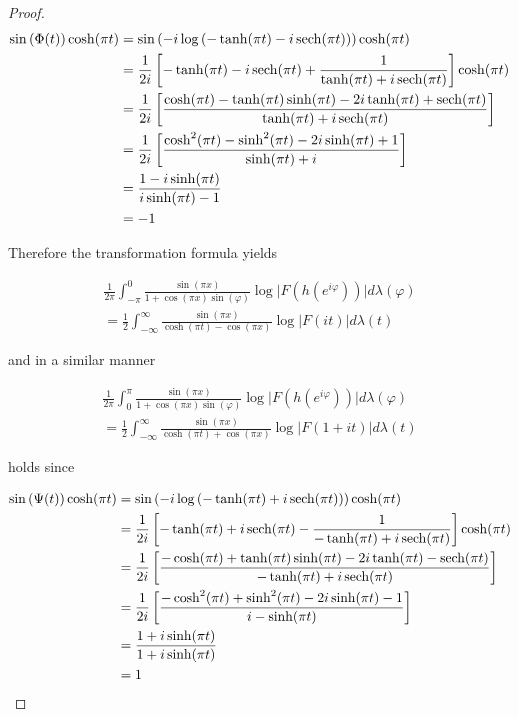 \begin{proof}
\begin{gather*}
	\begin{aligned}
		\sin\left( \Phi(t) \right)\cosh(\pi t) &= \sin\left( -i\log\left( -\tanh (\pi t) - i \operatorname{sech}(\pi t) \right)\right) \cosh(\pi t)\\
		&= \frac{1}{2i} \left[ -\tanh(\pi t) - i\operatorname{sech}(\pi t) + \frac{1}{\tanh(\pi t) + i\operatorname{sech}(\pi t) }\right]\cosh(\pi t)\\
		&= \frac{1}{2i} \left[ \frac{\cosh(\pi t) - \tanh(\pi t) \sinh(\pi t) - 2i\tanh(\pi t) + \operatorname{sech}(\pi t)}{\tanh(\pi t) + i\operatorname{sech}(\pi t)}\right]\\
		&= \frac{1}{2i} \left[ \frac{\cosh^2(\pi t) - \sinh^2(\pi t) - 2i \sinh(\pi t) + 1}{\sinh(\pi t) + i}\right]\\
		&= \frac{1 - i\sinh(\pi t)}{i\sinh(\pi t) - 1}\\
		&= -1
	\end{aligned}
\end{gather*}

Therefore the transformation formula yields

\begin{multline}
	\frac{1}{2\pi} \int_{-\pi}^0 \frac{\sin(\pi x)}{1 + \cos(\pi x)\sin(\varphi)} \log \vert F(h(e^{i\varphi}))\vert d\lambda(\varphi)\\ = \frac{1}{2}\int_{-\infty}^\infty\frac{\sin(\pi x)}{\cosh(\pi t) - \cos(\pi x)} \log\vert F(it) \vert d\lambda(t)
\end{multline}
				
and in a similar manner
		
\begin{multline}
	\frac{1}{2\pi} \int_0^\pi \frac{\sin(\pi x)}{1 + \cos(\pi x)\sin(\varphi)} \log \vert F(h(e^{i\varphi}))\vert d\lambda(\varphi)\\ = \frac{1}{2}\int_{-\infty}^\infty\frac{\sin(\pi x)}{\cosh(\pi t) + \cos(\pi x)} \log\vert F(1 + it) \vert d\lambda(t)
\end{multline}

holds since

\begin{gather*}
	\begin{aligned}
		\sin\left(\Psi(t)\right)\cosh(\pi t) &= \sin\left( -i\log\left( -\tanh (\pi t) + i \operatorname{sech}(\pi t) \right)\right) \cosh(\pi t)\\
		&= \frac{1}{2i} \left[ -\tanh(\pi t) + i\operatorname{sech}(\pi t) - \frac{1}{-\tanh(\pi t) + i\operatorname{sech}(\pi t) }\right]\cosh(\pi t)\\
		&= \frac{1}{2i} \left[ \frac{-\cosh(\pi t) + \tanh(\pi t) \sinh(\pi t) - 2i\tanh(\pi t) - \operatorname{sech}(\pi t)}{-\tanh(\pi t) + i\operatorname{sech}(\pi t)}\right]\\
		&= \frac{1}{2i} \left[ \frac{- \cosh^2(\pi t) + \sinh^2(\pi t) - 2i \sinh(\pi t) - 1}{i - \sinh(\pi t)}\right]\\
		&= \frac{1 + i\sinh(\pi t)}{1 + i\sinh(\pi t)}\\
		&= 1
	\end{aligned}
\end{gather*}


\end{proof}
